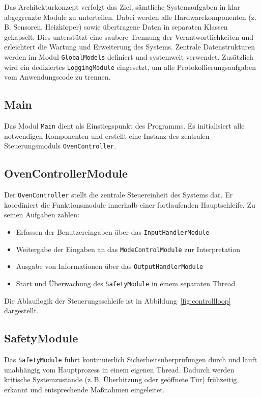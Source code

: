 \documentclass[a4paper,12pt]{article}
\begin{document}
Das Architekturkonzept verfolgt das Ziel, sämtliche Systemaufgaben in klar abgegrenzte Module zu unterteilen. Dabei werden alle Hardwarekomponenten (z.\,B. Sensoren, Heizkörper) sowie übertragene Daten in separaten Klassen gekapselt. Dies unterstützt eine saubere Trennung der Verantwortlichkeiten und erleichtert die Wartung und Erweiterung des Systems. Zentrale Datenstrukturen werden im Modul \texttt{GlobalModels} definiert und systemweit verwendet. Zusätzlich wird ein dediziertes \texttt{LoggingModule} eingesetzt, um alle Protokollierungsaufgaben vom Anwendungscode zu trennen.

\subsection*{Main}
Das Modul \texttt{Main} dient als Einstiegspunkt des Programms. Es initialisiert alle notwendigen Komponenten und erstellt eine Instanz des zentralen Steuerungsmoduls \texttt{OvenController}.

\subsection*{OvenControllerModule}
Der \texttt{OvenController} stellt die zentrale Steuereinheit des Systems dar. Er koordiniert die Funktionsmodule innerhalb einer fortlaufenden Hauptschleife. Zu seinen Aufgaben zählen:
\begin{itemize}
    \item Erfassen der Benutzereingaben über das \texttt{InputHandlerModule}
    \item Weitergabe der Eingaben an das \texttt{ModeControlModule} zur Interpretation
    \item Ausgabe von Informationen über das \texttt{OutputHandlerModule}
    \item Start und Überwachung des \texttt{SafetyModule} in einem separaten Thread
\end{itemize}
Die Ablauflogik der Steuerungsschleife ist in Abbildung~\ref{fig:controllloop} dargestellt.

\subsection*{SafetyModule}
Das \texttt{SafetyModule} führt kontinuierlich Sicherheitsüberprüfungen durch und läuft unabhängig vom Hauptprozess in einem eigenen Thread. Dadurch werden kritische Systemzustände (z.\,B. Überhitzung oder geöffnete Tür) frühzeitig erkannt und entsprechende Maßnahmen eingeleitet.
\end{document}
